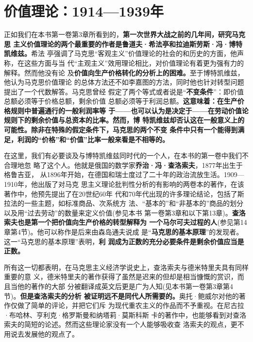 \section{价值理论：1914—1939年}

正如我们在本书第一卷第3章所看到的，\textbf{第一次世界大战之前的几年间，研究马克思
  主义价值理论的两个最重要的作者是鲁道夫·希法亭和拉迪斯劳斯·冯·博特凯维兹。}希法
亭强调了马克思“客观主义”价值理论的社会的和历史的方面，他声称，在这些方面与当
代“主观主义”效用理论相比，对价值理论有着更为强有力的解释。然而他没有论
及\textbf{价值向生产价格转化的分析上的困难。}至于博特凯维兹，他认为马克思价值理论
的总体方法还不如李嘉图的方法，同时他也针对转型问题提出了一个代数解答。马克思曾经
假定了两个等式或者说是“\textbf{不变条件}”：即价值总额必须等于价格总额，剩余价值
总额必须等于利润总额。\textbf{这意味着：在生产价格规则中普遍通行的一般利润率等
  于——也可以认为是决定于——在劳动价值论规则下的剩余价值与总资本的比率。然而，博
  特凯维兹却否认这在一般意义上的可能性。除非在特殊的假定条件下，马克思的两个不变
  条件中只有一个能得到满足，利润的“价格”和“价值”比率一般来看是不相等的。}

在这里，我们有必要谈及与博特凯维兹同时代的一个人，在本书的第一卷中我们不合理地忽
略了这个人。他就是俄国的数学家\textbf{乔治·冯·查洛索夫}，1877年出生于格鲁吉亚，
从1896年开始，在德国和瑞士度过了二十年的政治流放生活。1909—1910年，他出版了对马克
思主义理论批判性分析的有影响的两卷本的著作，在该著作中，他预先提出了在20世纪60年
代和70年代出现的许多理论结论，包括了斯拉法的一些主题，如标准商品、次系统方
法、“基本的”和“非基本的”商品的划分以及用“过去劳动”的数量来定义价值(参见本书
第一卷第3章和以下第13章)。\textbf{查洛索夫也是第一个把价值向生产价格的转型解释为
  一个马尔可夫过程的人}(参见第14章第4节)。他可以称作是后来由森岛通夫说成
是“\textbf{马克思的基本原理}”的发现者。这一“马克思的基本原理”表明，\textbf{利
  润成为正数的充分必要条件是剩余价值应当是正数。}

所有这一切都表明，在马克思主义经济学说史上，查洛索夫与德米特里夫具有同样重要的意
义，德米特里夫的著作获得了虽然是迟来的但却是相当慷慨的赏识，而且当他的著作的大部
分被翻译成英文后更是广为人知(见本书第一卷第3章第4节)。\textbf{但是查洛索夫的分析
  被证明远不是同代人所需要的。}奥托·鲍威尔对他的著作仅做了简单的评论，并把它们斥
为现代重农主义的作品而不予重视。在尼古拉·布哈林、亨利克·格罗斯曼和纳塔莉·莫斯科斯
卡的著作中，也能够看到对查洛索夫的简短的论述。然而这些理论家没有一个人能够吸收查
洛索夫的观点，更不用说去发展他的观点了。

